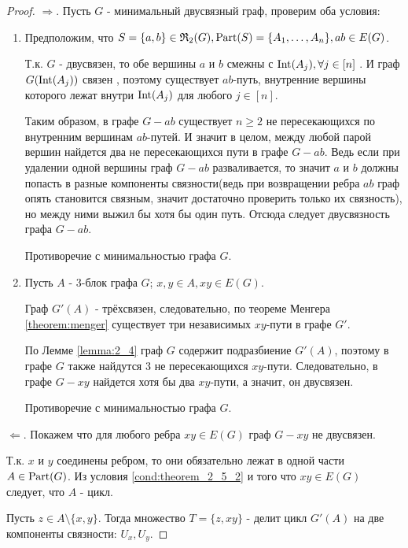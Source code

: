 \begin{proof}
	$\Longrightarrow$. Пусть  $G$ - минимальный двусвязный граф, проверим оба условия:

	\begin{enumerate}
		\item Предположим, что $S = \{a, b \} \in \mathfrak{R}_2(G), \operatorname{Part}(S) = \{A_1, \ldots, A_n\}, ab \in E(G)$.

			Т.к. $G$ - двусвязен, то обе вершины $a$ и $b$ смежны с $\operatorname{Int}(A_j), \forall j \in [n]$ .
			И граф  $G(\operatorname{Int}(A_j))$ связен , поэтому существует $ab$-путь, внутренние вершины которого лежат внутри  $\operatorname{Int}(A_j)$ для любого  $j \in [n]$. 

			Таким образом, в графе $G - ab$ существует  $n \geqslant 2$ не пересекающихся по внутренним вершинам  $ab$-путей.
			И значит в целом, между любой парой вершин найдется два не пересекающихся пути в графе $G - ab$. Ведь если при удалении одной вершины граф $G - ab$ разваливается, то значит  $a$ и $b$ должны попасть в разные компоненты связности(ведь при возвращении ребра $ab$ граф опять становится связным, значит достаточно проверить только их связность), но между ними выжил бы хотя бы один путь. Отсюда следует двусвязность графа  $G - ab$.

			Противоречие с минимальностью графа  $G$.

		\item Пусть $A$ - 3-блок графа $G$;  $x, y \in A, xy \in E(G)$.

			Граф  $G'(A)$ - трёхсвязен, следовательно, по теореме Менгера \ref{theorem:menger} существует три независимых  $xy$-пути в графе  $G'$. 

			По Лемме \ref{lemma:2_4} граф $G$ содержит подразбиение  $G'(A)$, поэтому в графе  $G$ также найдутся 3 не пересекающихся  $xy$-пути.
			Следовательно, в графе  $G - xy$ найдется хотя бы два  $xy$-пути, а значит, он двусвязен.

			Противоречие с минимальностью графа  $G$.
	\end{enumerate}

	$\Longleftarrow$. Покажем что для любого ребра $xy \in E(G)$ граф $G - xy$ не двусвязен.

	Т.к.  $x$ и  $y$ соединены ребром, то они обязательно лежат в одной части  $A \in \operatorname{Part}(G)$.
	Из условия \eqref{cond:theorem_2_5_2} и того что $xy \in E(G)$  следует, что  $A$ - цикл. 

	Пусть $z \in A \setminus \{x, y\}$.
	Тогда множество $T = \{z, xy\}$ - делит цикл $G'(A)$ на две компоненты связности:  $U_x, U_y$.


\end{proof}
